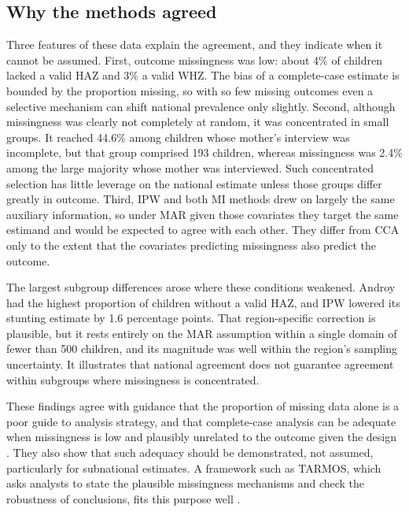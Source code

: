 \documentclass[11pt,a4paper]{article}
\begin{document}
\subsection{Why the methods agreed}\label{why-the-methods-agreed}

Three features of these data explain the agreement, and they indicate
when it cannot be assumed. First, outcome missingness was low: about 4\%
of children lacked a valid HAZ and 3\% a valid WHZ. The bias of a
complete-case estimate is bounded by the proportion missing, so with so
few missing outcomes even a selective mechanism can shift national
prevalence only slightly. Second, although missingness was clearly not
completely at random, it was concentrated in small groups. It reached
44.6\% among children whose mother's interview was incomplete, but that
group comprised 193 children, whereas missingness was 2.4\% among the
large majority whose mother was interviewed. Such concentrated selection
has little leverage on the national estimate unless those groups differ
greatly in outcome. Third, IPW and both MI methods drew on largely the
same auxiliary information, so under MAR given those covariates they
target the same estimand and would be expected to agree with each other.
They differ from CCA only to the extent that the covariates predicting
missingness also predict the outcome.

The largest subgroup differences arose where these conditions weakened.
Androy had the highest proportion of children without a valid HAZ, and
IPW lowered its stunting estimate by 1.6 percentage points. That
region-specific correction is plausible, but it rests entirely on the
MAR assumption within a single domain of fewer than 500 children, and
its magnitude was well within the region's sampling uncertainty. It
illustrates that national agreement does not guarantee agreement within
subgroups where missingness is concentrated.

These findings agree with guidance that the proportion of missing data
alone is a poor guide to analysis strategy, and that complete-case
analysis can be adequate when missingness is low and plausibly unrelated
to the outcome given the design
\cite{hughes2019accounting,jakobsen2017when}. They also show that such
adequacy should be demonstrated, not assumed, particularly for
subnational estimates. A framework such as TARMOS, which asks analysts
to state the plausible missingness mechanisms and check the robustness
of conclusions, fits this purpose well \cite{lee2021framework}.
\end{document}
